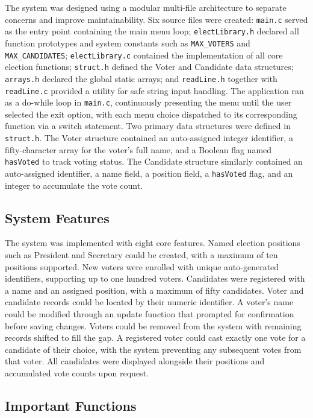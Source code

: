 \documentclass[12pt,a4paper]{article}
\begin{document}
The system was designed using a modular multi-file architecture to separate concerns
and improve maintainability. Six source files were created: \texttt{main.c} served as the
entry point containing the main menu loop; \texttt{electLibrary.h} declared all function
prototypes and system constants such as \texttt{MAX\_VOTERS} and \texttt{MAX\_CANDIDATES};
\texttt{electLibrary.c} contained the implementation of all core election functions;
\texttt{struct.h} defined the Voter and Candidate data structures; \texttt{arrays.h} declared
the global static arrays; and \texttt{readLine.h} together with \texttt{readLine.c} provided a
utility for safe string input handling. The application ran as a do-while loop in
\texttt{main.c}, continuously presenting the menu until the user selected the exit option,
with each menu choice dispatched to its corresponding function via a switch statement.
Two primary data structures were defined in \texttt{struct.h}. The Voter structure contained
an auto-assigned integer identifier, a fifty-character array for the voter's full name,
and a Boolean flag named \texttt{hasVoted} to track voting status. The Candidate structure
similarly contained an auto-assigned identifier, a name field, a position field, a
\texttt{hasVoted} flag, and an integer to accumulate the vote count.

\subsection{System Features}

The system was implemented with eight core features. Named election positions such as
President and Secretary could be created, with a maximum of ten positions supported.
New voters were enrolled with unique auto-generated identifiers, supporting up to one
hundred voters. Candidates were registered with a name and an assigned position, with
a maximum of fifty candidates. Voter and candidate records could be located by their
numeric identifier. A voter's name could be modified through an update function that
prompted for confirmation before saving changes. Voters could be removed from the
system with remaining records shifted to fill the gap. A registered voter could cast
exactly one vote for a candidate of their choice, with the system preventing any
subsequent votes from that voter. All candidates were displayed alongside their
positions and accumulated vote counts upon request.

\subsection{Important Functions}
\end{document}
